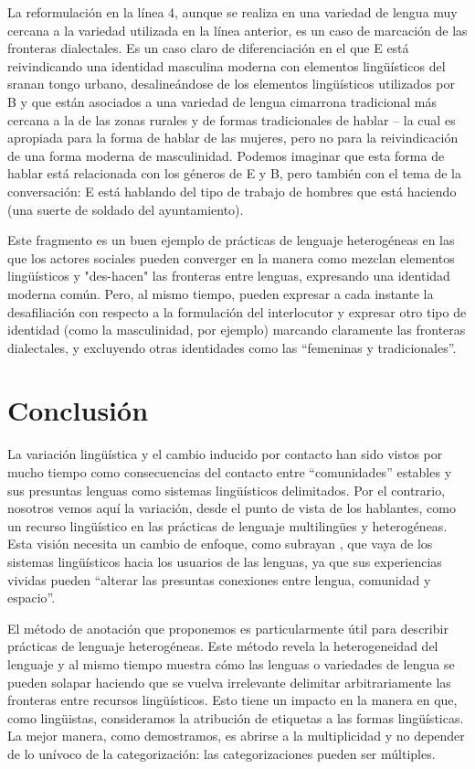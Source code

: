 \documentclass[output=paper]{langscibook}
\begin{document}
La reformulación en la línea 4, aunque se realiza en una variedad de lengua muy cercana a la variedad utilizada en la línea anterior, es un caso de marcación de las fronteras dialectales. Es un caso claro de diferenciación en el que E está reivindicando una identidad masculina moderna con elementos lingüísticos del sranan tongo urbano, desalineándose de los elementos lingüísticos utilizados por B y que están asociados a una variedad de lengua cimarrona tradicional más cercana a la de las zonas rurales y de formas tradicionales de hablar -- la cual es apropiada para la forma de hablar de las mujeres, pero no para la reivindicación de una forma moderna de masculinidad. Podemos imaginar que esta forma de hablar está relacionada con los géneros de E y B, pero también con el tema de la conversación: E está hablando del tipo de trabajo de hombres que está haciendo (una suerte de soldado del ayuntamiento).

Este fragmento es un buen ejemplo de prácticas de lenguaje heterogéneas en las que los actores sociales pueden converger en la manera como mezclan elementos lingüísticos y "des-hacen" las fronteras entre lenguas, expresando una identidad moderna común. Pero, al mismo tiempo, pueden expresar a cada instante la desafiliación con respecto a la formulación del interlocutor y expresar otro tipo de identidad (como la masculinidad, por ejemplo) marcando claramente las fronteras dialectales, y excluyendo otras identidades como las “femeninas y tradicionales”. 

\section{Conclusión}


La variación lingüística y el cambio inducido por contacto han sido vistos por mucho tiempo como consecuencias del contacto entre “comunidades” estables y sus presuntas lenguas como sistemas lingüísticos delimitados. Por el contrario, nosotros vemos aquí la variación, desde el punto de vista de los hablantes, como un recurso lingüístico en las prácticas de lenguaje multilingües y heterogéneas. Esta visión necesita un cambio de enfoque, como subrayan   \citet[615]{HallNilep2015}, que vaya de los sistemas lingüísticos hacia los usuarios de las lenguas, ya que sus experiencias vividas pueden “alterar las presuntas conexiones entre lengua, comunidad y espacio”.

El método de anotación que proponemos es particularmente útil para describir prácticas de lenguaje heterogéneas. Este método revela la heterogeneidad del lenguaje y al mismo tiempo muestra cómo las lenguas o variedades de lengua se pueden solapar haciendo que se vuelva irrelevante delimitar arbitrariamente las fronteras entre recursos lingüísticos. Esto tiene un impacto en la manera en que, como lingüistas, consideramos la atribución de etiquetas a las formas lingüísticas. La mejor manera, como demostramos, es abrirse a la multiplicidad y no depender de lo unívoco de la categorización: las categorizaciones pueden ser múltiples.
\end{document}
